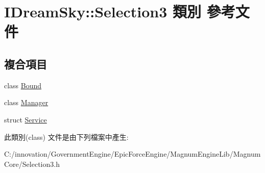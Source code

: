 \hypertarget{class_i_dream_sky_1_1_selection3}{}\section{I\+Dream\+Sky\+:\+:Selection3 類別 參考文件}
\label{class_i_dream_sky_1_1_selection3}
\subsection*{複合項目}
\begin{DoxyCompactItemize}
\item 
class \hyperlink{class_i_dream_sky_1_1_selection3_1_1_bound}{Bound}
\item 
class \hyperlink{class_i_dream_sky_1_1_selection3_1_1_manager}{Manager}
\item 
struct \hyperlink{struct_i_dream_sky_1_1_selection3_1_1_service}{Service}
\end{DoxyCompactItemize}


此類別(class) 文件是由下列檔案中產生\+:\begin{DoxyCompactItemize}
\item 
C\+:/innovation/\+Government\+Engine/\+Epic\+Force\+Engine/\+Magnum\+Engine\+Lib/\+Magnum\+Core/Selection3.\+h\end{DoxyCompactItemize}
